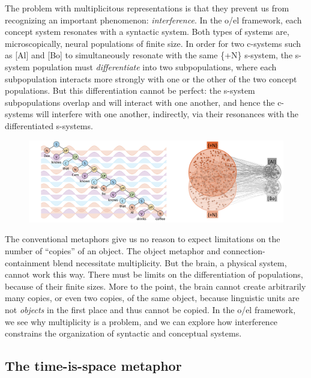   The problem with multiplicitous representations is that they prevent us from recognizing an important phenomenon: \textit{interference}. In the o/el framework, each concept system resonates with a syntactic system. Both types of systems are, microscopically, neural populations of finite size. In order for two c-systems such as [Al] and [Bo] to simultaneously resonate with the same \{+N\} s-system, the s-system population must \textit{differentiate} into two subpopulations, where each subpopulation interacts more strongly with one or the other of the two concept populations. But this differentiation cannot be perfect: the s-system subpopulations overlap and will interact with one another, and hence the c-systems will interfere with one another, indirectly, via their resonances with the differentiated s-systems. 

  
\begin{figure}
\includegraphics[width=\textwidth]{figures/Tilsen-img37.png}
\caption{\missingcaption}
\label{fig:}
\end{figure}
 

  The conventional metaphors give us no reason to expect limitations on the number of “copies” of an object. The object metaphor and connection-containment blend necessitate multiplicity. But the brain, a physical system, cannot work this way. There must be limits on the differentiation of populations, because of their finite sizes. More to the point, the brain cannot create arbitrarily many copies, or even two copies, of the same object, because linguistic units are not \textit{objects} in the first place and thus cannot be copied. In the o/el framework, we see why multiplicity is a problem, and we can explore how interference constrains the organization of syntactic and conceptual systems.

\subsection{The time-is-space metaphor}

